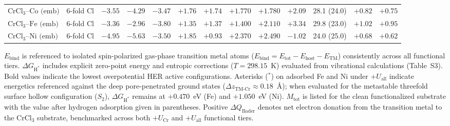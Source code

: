 \documentclass[journal=jacsat,manuscript=article]{achemso}
\begin{document}
{\begin{table}[htbp]
\begin{adjustbox}{max width=\textwidth}
\begin{tabular}{lcccccccccccc}
        \midrule
        $\text{CrCl}_3\text{--Co (emb)}$ & 6-fold Cl       & $-3.55$                                                          & $-4.29$                                                                & $-3.47$                        & $+1.76$                       & $+1.74$                                                                   & $+1.770$                  & $+1.780$                   & $+2.09$            & 28.1 (24.0)        & $+0.82$                   & $+0.75$                    \\
        $\text{CrCl}_3\text{--Fe (emb)}$ & 6-fold Cl       & $-3.36$                                                          & $-2.96$                                                                & $-3.80$                        & $+1.35$                       & $+1.37$                                                                   & $+1.400$                  & $+2.110$                   & $+3.34$            & 29.8 (23.0)        & $+1.02$                   & $+0.95$                    \\
        $\text{CrCl}_3\text{--Ni (emb)}$ & 6-fold Cl       & $-4.95$                                                          & $-5.63$                                                                & $-3.50$                        & $+1.85$                       & $+0.93$                                                                   & $+2.370$                  & $+2.490$                   & $-1.02$            & 24.0 (25.0)        & $+0.68$                   & $+0.62$                    \\
        \bottomrule
      \end{tabular}
    \end{adjustbox}
    \vspace{1ex}
    \begin{minipage}{0.98\textwidth}
      \footnotesize\color{revcolor}
      $E_{\text{bind}}$ is referenced to isolated spin-polarized gas-phase transition metal atoms ($E_{\text{bind}} = E_{\text{tot}} - E_{\text{host}} - E_{\text{TM}}$) consistently across all functional tiers. $\Delta G_{\text{H}^*}$ includes explicit zero-point energy and entropic corrections ($T = 298.15$~K) evaluated from vibrational calculations (Table~S3). Bold values indicate the lowest overpotential HER active configurations. Asterisks ($^*$) on adsorbed Fe and Ni under $+U_{\text{all}}$ indicate energetics referenced against the deep pore-penetrated ground states ($\Delta z_{\text{TM-Cr}} \approx 0.18$~\AA); when evaluated for the metastable threefold surface hollow configuration ($S_2$), $\Delta G_{\text{H}^*}$ remains at $+0.470$~eV (Fe) and $+1.050$~eV (Ni). $M_{\text{tot}}$ is listed for the clean functionalized substrate with the value after hydrogen adsorption given in parentheses. Positive $\Delta Q_{\text{Bader}}$ denotes net electron donation from the transition metal to the $\text{CrCl}_3$ substrate, benchmarked across both $+U_{\text{Cr}}$ and $+U_{\text{all}}$ functional tiers.
    \end{minipage}
  \end{table}
\par}
\end{document}
